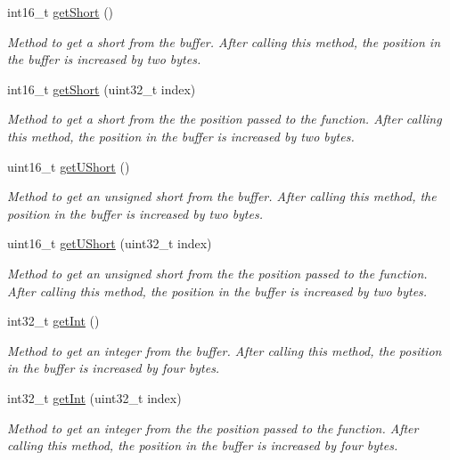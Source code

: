 \begin{DoxyCompactItemize}
int16\_\-t \hyperlink{classBuffer_a6c22f064293935062f5b61c1d924132d}{getShort} ()
\begin{DoxyCompactList}\small\item\em Method to get a short from the buffer. After calling this method, the position in the buffer is increased by two bytes. \item\end{DoxyCompactList}\item 
int16\_\-t \hyperlink{classBuffer_a7eb9d5449cf6553dca6808775d7f5583}{getShort} (uint32\_\-t index)
\begin{DoxyCompactList}\small\item\em Method to get a short from the the position passed to the function. After calling this method, the position in the buffer is increased by two bytes. \item\end{DoxyCompactList}\item 
uint16\_\-t \hyperlink{classBuffer_aafccc403480bca311e3837a691e696b4}{getUShort} ()
\begin{DoxyCompactList}\small\item\em Method to get an unsigned short from the buffer. After calling this method, the position in the buffer is increased by two bytes. \item\end{DoxyCompactList}\item 
uint16\_\-t \hyperlink{classBuffer_a7951a4bc4a72c3af88c829903949d8c7}{getUShort} (uint32\_\-t index)
\begin{DoxyCompactList}\small\item\em Method to get an unsigned short from the the position passed to the function. After calling this method, the position in the buffer is increased by two bytes. \item\end{DoxyCompactList}\item 
int32\_\-t \hyperlink{classBuffer_a7210e64bc79fe779306f0ba8f6d27ec0}{getInt} ()
\begin{DoxyCompactList}\small\item\em Method to get an integer from the buffer. After calling this method, the position in the buffer is increased by four bytes. \item\end{DoxyCompactList}\item 
int32\_\-t \hyperlink{classBuffer_af5a294ff99464564ef35bf5ab6b93cf3}{getInt} (uint32\_\-t index)
\begin{DoxyCompactList}\small\item\em Method to get an integer from the the position passed to the function. After calling this method, the position in the buffer is increased by four bytes. \item\end{DoxyCompactList}\item 

\end{DoxyCompactItemize}
